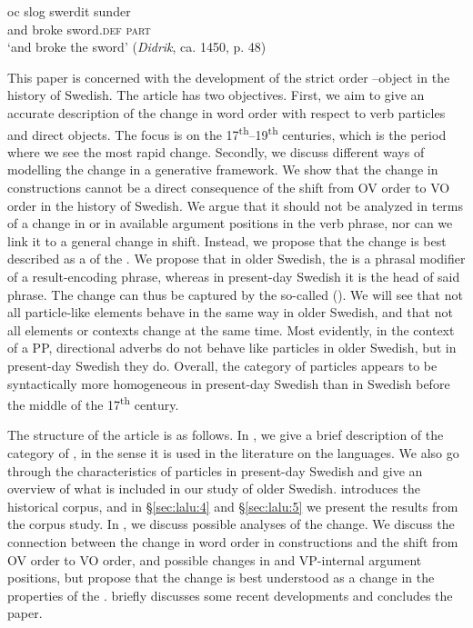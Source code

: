 \documentclass[output=paper]{langscibook}
\begin{document}
\ex
\gll oc    slog     swerdit     sunder\\
      and  broke   sword\textsc{.def}   \textsc{part}\\
  \glt  ‘and broke the sword’ (\textit{Didrik}, ca. 1450, p. 48)

\z
\z

This paper is concerned with the development of the strict order –object in the history of Swedish. The article has two objectives. First, we aim to give an accurate description of the change in word order with respect to verb particles and direct objects. The focus is on the 17\textsuperscript{th}--19\textsuperscript{th} centuries, which is the period where we see the most rapid change. Secondly, we discuss different ways of modelling the change in a generative framework. We show that the change in  constructions cannot be a direct consequence of the shift from OV order to VO order in the history of Swedish. We argue that it should not be analyzed in terms of a change in  or in available argument positions in the verb phrase, nor can we link it to a general change in  shift. Instead, we propose that the change is best described as a  of the . We propose that in older Swedish, the  is a phrasal modifier of a result-encoding phrase, whereas in present-day Swedish it is the head of said phrase. The change can thus be captured by the so-called  (\citealt{van_Gelderen2004}). We will see that not all particle-like elements behave in the same way in older Swedish, and that not all elements or contexts change at the same time. Most evidently, in the context of a PP, directional adverbs do not behave like particles in older Swedish, but in present-day Swedish they do. Overall, the category of particles appears to be syntactically more homogeneous in present-day Swedish than in Swedish before the middle of the 17\textsuperscript{th} century. 



The structure of the article is as follows. In , we give a brief description of the category of , in the sense it is used in the literature on the  languages. We also go through the characteristics of particles in present-day Swedish and give an overview of what is included in our study of older Swedish.  introduces the historical corpus, and in §\ref{sec:lalu:4} and §\ref{sec:lalu:5} we present the results from the corpus study. In , we discuss possible analyses of the change. We discuss the connection between the change in word order in  constructions and the shift from OV order to VO order, and possible changes in  and VP-internal argument positions, but propose that the change is best understood as a change in the properties of the .  briefly discusses some recent developments and concludes the paper.
\end{document}
